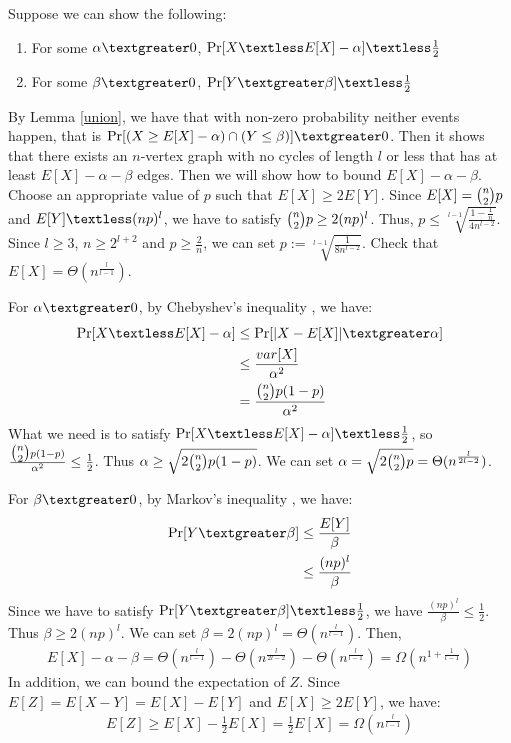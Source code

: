 Suppose we can show the following:
\begin{enumerate}
    \item For some $\alpha \textgreater 0$, $\Pr[X\textless E[X]-\alpha] \textless \frac{1}{2}$
    \item For some $\beta \textgreater 0$, $\Pr[Y \textgreater \beta]\textless \frac{1}{2}$
\end{enumerate}
By Lemma \ref{union}, we have that with non-zero probability neither events happen, that is $\Pr[(X\ge E[X]-\alpha)\cap (Y \le \beta)]\textgreater 0$. Then it shows that there exists an $n$-vertex graph with no cycles of length $l$ or less that has at least $E[X]-\alpha-\beta$ edges. 
Then we will show how to bound $E[X]-\alpha-\beta$.
Choose an appropriate value of $p$ such that $E[X] \ge 2E[Y]$. Since $E[X]=\tbinom{n}{2}p$ and $E[Y]\textless (np)^l$, we have to satisfy $\tbinom{n}{2}p \ge 2(np)^l$. Thus, $p\le  \sqrt[l-1]{\frac{1-\frac{1}{n}}{4n^{l-2}}}$. Since $l\ge 3$, $n\ge 2^{l+2}$ and $p\ge \frac{2}{n}$, we can set $p:=\sqrt[l-1]{\frac{1}{8n^{l-2}}}$. Check that $E[X]=\Theta (n^\frac{l}{l-1})$.%

For $\alpha \textgreater 0$, by 
Chebyshev's inequality
, we have:
\begin{align}
    \nonumber \Pr[X\textless E[X]-\alpha]&\le \Pr[|X-E[X]|\textgreater \alpha]\\ 
    \nonumber &\le \frac{var[X]}{\alpha^2}\\
    \nonumber &=\frac{\tbinom{n}{2}p(1-p)}{\alpha^2}
\end{align}
What we need is to satisfy $\Pr[X\textless E[X]-\alpha] \textless \frac{1}{2}$, so $\frac{\tbinom{n}{2}p(1-p)}{\alpha^2}\le \frac{1}{2} $. Thus $\alpha \ge \sqrt{2\tbinom{n}{2}p(1-p)}$. We can set $\alpha = \sqrt{2\tbinom{n}{2}p}=\Theta(n^{\frac{l}{2l-2}})$.

For $\beta \textgreater 0$, by 
Markov's inequality
, we have: 
\begin{align}
    \nonumber \Pr[Y \textgreater \beta] &\le \frac{E[Y]}{\beta}\\
    \nonumber & \le \frac{(np)^l}{\beta} 
\end{align}
Since we have to satisfy $\Pr[Y \textgreater \beta]\textless \frac{1}{2}$, we have $\frac{(np)^l}{\beta} \le \frac{1}{2}$. Thus $\beta \ge 2(np)^l$. We can set $\beta = 2(np)^l = \Theta (n^{\frac{l}{l-1}})$.
Then,
\begin{align}
    \nonumber E[X]-\alpha-\beta = \Theta (n^\frac{l}{l-1}) - \Theta(n^{\frac{l}{2l-2}}) - \Theta (n^{\frac{l}{l-1}})=\Omega (n^{1+\frac{1}{l-1}})
\end{align}
In addition, we can bound the expectation of $Z$.
Since $E[Z]=E[X-Y]=E[X]-E[Y]$ and $E[X]\ge 2E[Y]$, we have:
\begin{align}
    \nonumber E[Z]\ge E[X]-\frac{1}{2}E[X]=\frac{1}{2}E[X]=\Omega (n^\frac{l}{l-1})
\end{align}

